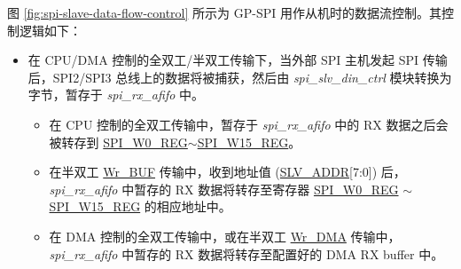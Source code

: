 \documentclass[main\_\_CN.tex]{subfiles}
\begin{document}
图 \ref{fig:spi-slave-data-flow-control} 所示为 GP-SPI 用作从机时的数据流控制。其控制逻辑如下：
\begin{itemize}
    \item 在 CPU/DMA 控制的全双工/半双工传输下，当外部 SPI 主机发起 SPI 传输后，SPI2/SPI3 总线上的数据将被捕获，然后由 \textit{spi\_slv\_din\_ctrl} 模块转换为字节，暂存于 \textit{spi\_rx\_afifo} 中。
    \begin{itemize}
        \item 在 CPU 控制的全双工传输中，暂存于 \textit{spi\_rx\_afifo} 中的 RX 数据之后会被转存到 \hyperref[regdesc:SPIW0REG]{SPI\_W0\_REG}$\sim$\hyperref[regdesc:SPIW15REG]{SPI\_W15\_REG}。
        
        \item 在半双工 \hyperref[cmd:wrbuf]{Wr\_BUF} 传输中，收到地址值 (\hyperref[regdesc:SPIW0REG]{SLV\_ADDR}[7:0]) 后，\textit{spi\_rx\_afifo} 中暂存的 RX 数据将转存至寄存器 \hyperref[regdesc:SPIW0REG]{SPI\_W0\_REG} $\sim$\hyperref[regdesc:SPIW15REG]{SPI\_W15\_REG} 的相应地址中。
       
        \item 在 DMA 控制的全双工传输中，或在半双工 \hyperref[cmd:wrdma]{Wr\_DMA} 传输中，\textit{spi\_rx\_afifo} 中暂存的 RX 数据将转存至配置好的 DMA RX buffer 中。
        
    \end{itemize}


\end{itemize}
\end{document}
